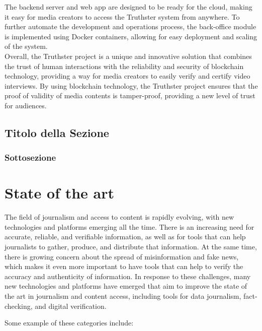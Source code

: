 \documentclass[target=mst,aauheader=]{thud}
\begin{document}
The backend server and web app are designed to be ready for the cloud, making it easy for media creators to access the Truthster system from anywhere. To further automate the development and operations process, the back-office module is implemented using Docker containers, allowing for easy deployment and scaling of the system.\\

Overall, the Truthster project is a unique and innovative solution that combines the trust of human interactions with the reliability and security of blockchain technology, providing a way for media creators to easily verify and certify video interviews. By using blockchain technology, the Truthster project ensures that the proof of validity of media contents is tamper-proof, providing a new level of trust for audiences.

\section{Titolo della Sezione}

\subsection{Sottosezione}





\chapter{State of the art}

The field of journalism and access to content is rapidly evolving, with new technologies and platforms emerging all the time. There is an increasing need for accurate, reliable, and verifiable information, as well as for tools that can help journalists to gather, produce, and distribute that information. At the same time, there is growing concern about the spread of misinformation and fake news, which makes it even more important to have tools that can help to verify the accuracy and authenticity of information. In response to these challenges, many new technologies and platforms have emerged that aim to improve the state of the art in journalism and content access, including tools for data journalism, fact-checking, and digital verification.\par
Some example of these categories include:
\end{document}

